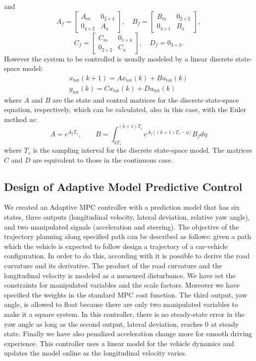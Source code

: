 \documentclass[conference,11pt]{IEEEtran}
\renewcommand{\vec}[1]{\ensuremath{\boldsymbol{\mathit{#1}}}}
\begin{document}
and
\[ 
\vec{A}_f=\begin{bmatrix}
\vec{A}_m&\vec{0}_{2\times4}\\
\vec{0}_{4\times2}&\vec{A}_a
\end{bmatrix},
\quad
\vec{B}_f=\begin{bmatrix}
\vec{B}_m&\vec{0}_{2\times2}\\
\vec{0}_{4\times1}&\vec{B}_a
\end{bmatrix},
\]
\[
\vec{C}_f=\begin{bmatrix}
\vec{C}_m&\vec{0}_{1\times4}\\
\vec{0}_{2\times2}&\vec{C}_a
\end{bmatrix}, 
\quad
\vec{D}_f=\vec{0}_{3\times3}. 
\]
However the system to be controlled is usually modeled by a linear discrete state-space model:
\begin{equation*}
\label{eqn:full_dynamics_model_disc}
\begin{array}{rr}
{\vec{x}}_{\text{tot}}(k+1) =\vec{A} \vec{x}_{\text{tot}}(k)+ \vec{B} \vec{u}_{\text{tot}}(k)\\
\vec{y}_{\text{tot}}(k) = \vec{C}\vec{x}_{\text{tot}}(k) + \vec{D} \vec{u}_{\text{tot}}(k)
\end{array}
\end{equation*}
where $\vec{A}$ and $\vec{B}$ are the state and control matrices for the discrete state-space equation, respectively, which can be calculated, also in this case, with the Euler method as:
\[
\vec{A} = e^{\vec{A}_fT_s},\qquad \vec{B} = \int_{kT_s}^{(k+1)T_s} e^{\vec{A}_f[(k+1)T_s-\eta]}\vec{B}_f d\eta
\]
where $T_s$ is the sampling interval for the discrete state-space model. The matrices $\vec{C}$ and $\vec{D}$ are equivalent to those in the continuous case.

\subsection{Design of Adaptive Model Predictive Control}
We created an Adaptive MPC controller with a prediction model that has six states, three outputs (longitudinal velocity, lateral deviation, relative yaw angle), and two manipulated signals (acceleration and steering). 
The objective of the trajectory planning along specified path can be described as follows: given a path which the vehicle is expected to follow design a trajectory of a car-vehicle configuration.
In order to do this, according with \cite{curvature} it is possible to derive the road curvature and its derivative.
The product of the road curvature and the longitudinal velocity is modeled as a measured disturbance. We have set the constraints for manipulated variables and the scale factors. Moreover we have specified the weights in the standard MPC cost function. The third output, yaw angle, is allowed to float because there are only two manipulated variables to make it a square system. In this controller, there is no steady-state error in the yaw angle as long as the second output, lateral deviation, reaches 0 at steady state. Finally we have also penalized acceleration change more for smooth driving experience. This controller uses a linear model for the vehicle dynamics and updates the model online as the longitudinal velocity varies.
\end{document}
